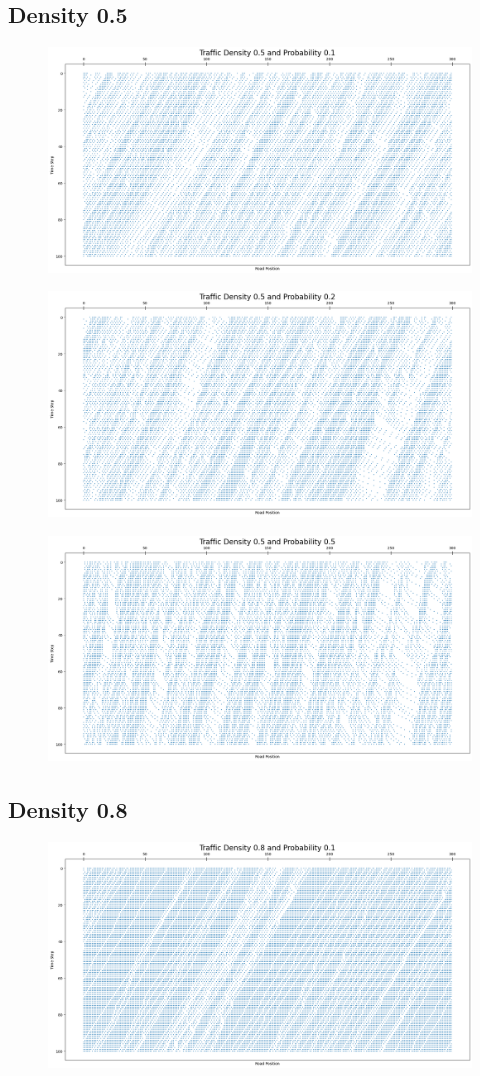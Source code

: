 \documentclass{article}
\begin{document}
\newpage
\subsection{Density 0.5}
\begin{figure}[!h]
    \centering
    \includegraphics[width=0.70\linewidth]{assets/d0.5p0.1.png}
\end{figure}

\begin{figure}[!h]
    \centering
    \includegraphics[width=0.70\linewidth]{assets/d0.5p0.2.png}
\end{figure}

\begin{figure}[!h]
    \centering
    \includegraphics[width=0.70\linewidth]{assets/d0.5p0.5.png}
\end{figure}

\newpage
\subsection{Density 0.8}
\begin{figure}[!h]
    \centering
    \includegraphics[width=0.70\linewidth]{assets/d0.8p0.1.png}
\end{figure}
\end{document}
